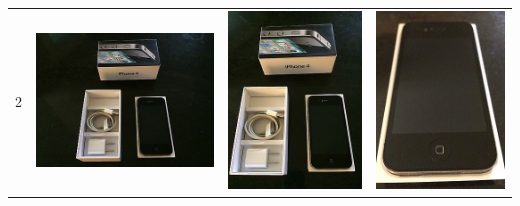 \begin{longtable}{| l | l | l | l |}
	\multirow{6}{*}{2} & \includegraphics[scale=0.25]{images/ground_truth/2/image_1} & \includegraphics[scale=0.25]{images/ground_truth/2/image_2} & \includegraphics[scale=0.25]{images/ground_truth/2/image_3} \\

\end{longtable}
